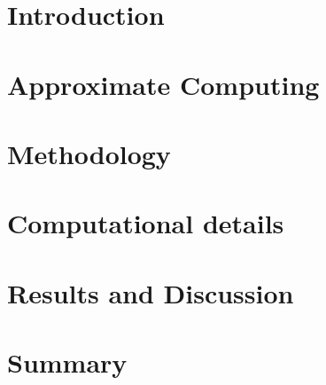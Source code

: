 \documentclass[format=acmsmall,review,authorversion,timestamp]{acmart}
\begin{document}



\maketitle



\section{Introduction}


\section{Approximate Computing}

%

\section{Methodology}


\section{Computational details}


\section{Results and Discussion}


\section{Summary}



\end{document}
